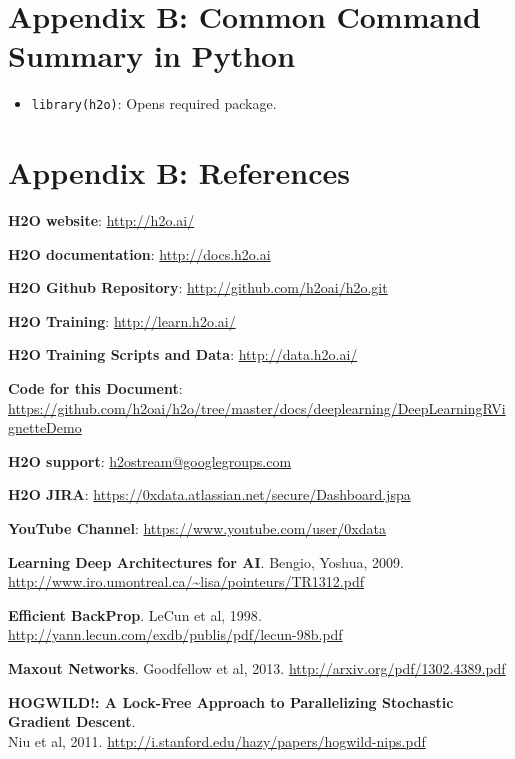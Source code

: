 \newpage

\section{Appendix B: Common Command Summary in Python}
\begin{itemize}

\item \texttt{library(h2o)}: Opens required package.


\end{itemize}




\newpage
\section{Appendix B: References}

\textbf{H2O website}:  {\url{http://h2o.ai/}}

\textbf{H2O documentation}:  {\url{http://docs.h2o.ai}}

\textbf{H2O Github Repository}:  {\url{http://github.com/h2oai/h2o.git}}

\textbf{H2O Training}:    {\url{http://learn.h2o.ai/}}

\textbf{H2O Training Scripts and Data}: {\url{http://data.h2o.ai/}} 

\textbf{Code for this Document}:   \\
 {\url{https://github.com/h2oai/h2o/tree/master/docs/deeplearning/DeepLearningRVignetteDemo}}

\textbf{H2O support}:   {\url{h2ostream@googlegroups.com}}

\textbf{H2O JIRA}: {\url{https://0xdata.atlassian.net/secure/Dashboard.jspa}}

\textbf{YouTube Channel}: {\url{https://www.youtube.com/user/0xdata}}

\textbf{Learning Deep Architectures for AI}. Bengio, Yoshua, 2009. \\
 {\url{http://www.iro.umontreal.ca/~lisa/pointeurs/TR1312.pdf}}

\textbf{Efficient BackProp}.  {LeCun et al, 1998}. {\url{http://yann.lecun.com/exdb/publis/pdf/lecun-98b.pdf}}

\textbf{Maxout Networks}. {Goodfellow et al, 2013}.  {\url{http://arxiv.org/pdf/1302.4389.pdf}}

\textbf{HOGWILD!: A Lock-Free Approach to Parallelizing Stochastic Gradient Descent}.  \\
{Niu et al, 2011}.  {\url{http://i.stanford.edu/hazy/papers/hogwild-nips.pdf}}

